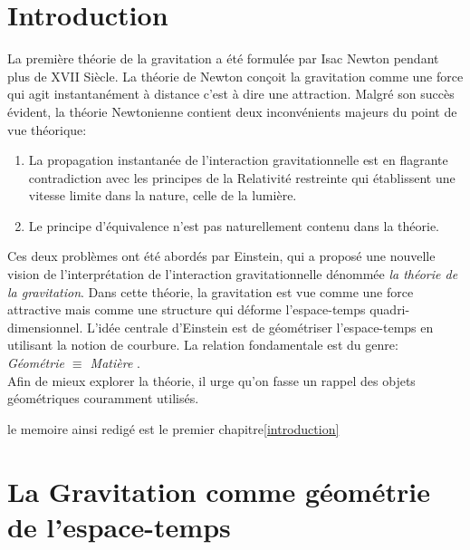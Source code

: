 \documentclass[a4paper,12pt]{report}
\theoremstyle{plain}
\theoremstyle{plain}
\begin{document}
\section{Introduction}
La premi\`ere th\'eorie de la gravitation a \'et\'e formul\'ee par Isac Newton pendant plus de XVII Si\`ecle.
La th\'eorie de Newton con\c{c}oit la gravitation comme une force qui agit instantan\'ement \`a distance c'est \`a dire 
une attraction. Malgr\'e son succ\`es
\'evident, la th\'eorie Newtonienne contient deux inconv\'enients majeurs du point de vue th\'eorique:
\begin{enumerate}
 \item La propagation instantan\'ee de l'interaction gravitationnelle est en flagrante contradiction avec les principes
 de la Relativit\'e restreinte
 qui \'etablissent une vitesse limite dans la nature, celle de la lumi\`ere.
 \item Le principe d'\'equivalence n'est pas naturellement contenu dans la th\'eorie.
\end{enumerate}
Ces deux probl\`emes ont \'et\'e abord\'es par Einstein, qui a propos\'e une nouvelle vision de l'interpr\'etation de 
l'interaction gravitationnelle
d\'enomm\'ee {\it la th\'eorie de la gravitation}. Dans cette th\'eorie, la gravitation est vue comme une force attractive
mais comme une structure 
qui d\'eforme l'espace-temps quadri-dimensionnel. L'id\'ee centrale d'Einstein est de g\'eom\'etriser l'espace-temps en 
utilisant la notion de courbure. La relation fondamentale est du genre:\\  
{\it G\'eom\'etrie $\equiv$ Mati\`ere }.\\
Afin de mieux explorer la th\'eorie, il urge qu'on fasse un rappel des objets g\'eom\'etriques couramment utilis\'es.


le memoire ainsi redigé est 
le premier chapitre\ref{introduction} 

\section{La Gravitation comme g\'eom\'etrie de l'espace-temps}
\end{document}
